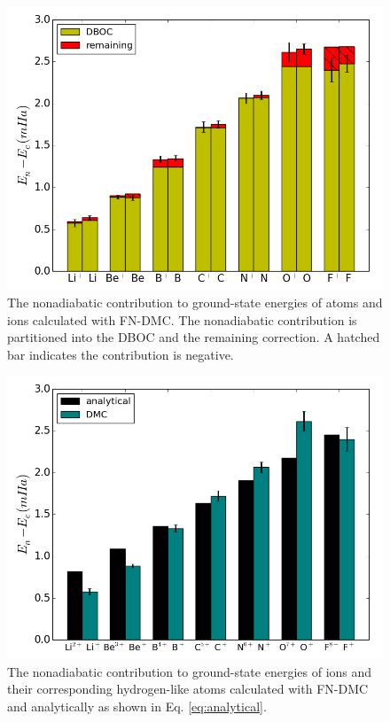 \documentclass[aip,jcp,numerical,reprint]{revtex4-1}
\begin{document}
\begin{figure}[h]
\includegraphics[scale=.4]{atom-nad-ad}
\caption{The nonadiabatic contribution to ground-state energies of atoms and ions calculated with FN-DMC. The nonadiabatic contribution is partitioned into the DBOC and the remaining correction. A hatched bar indicates the contribution is negative. \label{fig:atom-nad-ad}} %
\end{figure}

\begin{figure}[h]
\includegraphics[scale=.4]{analytical}
\caption{The nonadiabatic contribution to ground-state energies of ions and their corresponding hydrogen-like atoms calculated with FN-DMC and analytically as shown in Eq. \ref{eq:analytical}. \label{fig:analytical}}
\end{figure}
\end{document}
